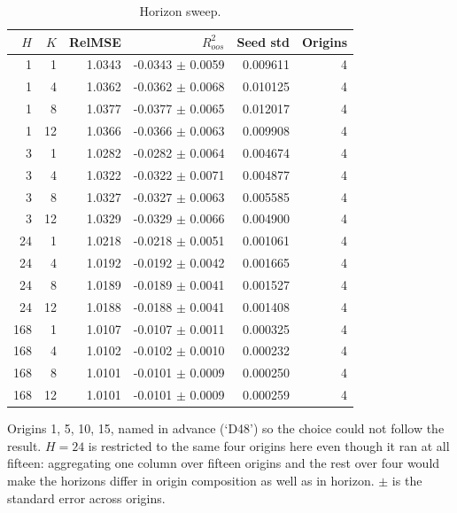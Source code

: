 \begin{table}[!t]
\centering
\caption{Horizon sweep.}
\label{tab:horizons}
\begin{tabular}{rrrrrr}
\toprule
$H$ & $K$ & RelMSE & $R^2_{oos}$ & Seed std & Origins \\
\midrule
1 & 1 & 1.0343 & -0.0343 $\pm$ 0.0059 & 0.009611 & 4 \\
1 & 4 & 1.0362 & -0.0362 $\pm$ 0.0068 & 0.010125 & 4 \\
1 & 8 & 1.0377 & -0.0377 $\pm$ 0.0065 & 0.012017 & 4 \\
1 & 12 & 1.0366 & -0.0366 $\pm$ 0.0063 & 0.009908 & 4 \\
3 & 1 & 1.0282 & -0.0282 $\pm$ 0.0064 & 0.004674 & 4 \\
3 & 4 & 1.0322 & -0.0322 $\pm$ 0.0071 & 0.004877 & 4 \\
3 & 8 & 1.0327 & -0.0327 $\pm$ 0.0063 & 0.005585 & 4 \\
3 & 12 & 1.0329 & -0.0329 $\pm$ 0.0066 & 0.004900 & 4 \\
24 & 1 & 1.0218 & -0.0218 $\pm$ 0.0051 & 0.001061 & 4 \\
24 & 4 & 1.0192 & -0.0192 $\pm$ 0.0042 & 0.001665 & 4 \\
24 & 8 & 1.0189 & -0.0189 $\pm$ 0.0041 & 0.001527 & 4 \\
24 & 12 & 1.0188 & -0.0188 $\pm$ 0.0041 & 0.001408 & 4 \\
168 & 1 & 1.0107 & -0.0107 $\pm$ 0.0011 & 0.000325 & 4 \\
168 & 4 & 1.0102 & -0.0102 $\pm$ 0.0010 & 0.000232 & 4 \\
168 & 8 & 1.0101 & -0.0101 $\pm$ 0.0009 & 0.000250 & 4 \\
168 & 12 & 1.0101 & -0.0101 $\pm$ 0.0009 & 0.000259 & 4 \\
\bottomrule
\end{tabular}
\vspace{2pt}\par\footnotesize Origins 1, 5, 10, 15, named in advance (`D48') so the choice could not follow the result. $H=24$ is restricted to the same four origins here even though it ran at all fifteen: aggregating one column over fifteen origins and the rest over four would make the horizons differ in origin composition as well as in horizon. $\pm$ is the standard error across origins.
\end{table}
